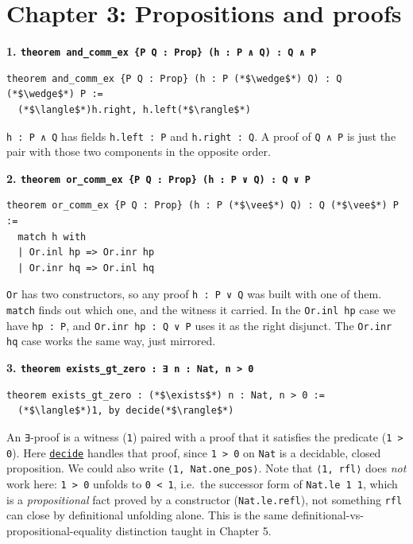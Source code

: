 \section{Chapter 3: Propositions and proofs}\label{sec:14-appendix-solutions:02-chapter-3:1}

\textbf{1. \texttt{theorem and\_\allowbreak{}comm\_\allowbreak{}ex \{P Q : Prop\} (h : P ∧ Q) : Q ∧ P}}

\begin{lstlisting}
theorem and_comm_ex {P Q : Prop} (h : P (*$\wedge$*) Q) : Q (*$\wedge$*) P :=
  (*$\langle$*)h.right, h.left(*$\rangle$*)
\end{lstlisting}

\texttt{h : P ∧ Q} has fields \texttt{h.left : P} and \texttt{h.right : Q}. A proof of \texttt{Q ∧ P} is just the pair with those two components in the opposite order.

\textbf{2. \texttt{theorem or\_\allowbreak{}comm\_\allowbreak{}ex \{P Q : Prop\} (h : P ∨ Q) : Q ∨ P}}

\begin{lstlisting}
theorem or_comm_ex {P Q : Prop} (h : P (*$\vee$*) Q) : Q (*$\vee$*) P :=
  match h with
  | Or.inl hp => Or.inr hp
  | Or.inr hq => Or.inl hq
\end{lstlisting}

\texttt{Or} has two constructors, so any proof \texttt{h : P ∨ Q} was built with one of them. \texttt{match} finds out which one, and the witness it carried. In the \texttt{Or.inl hp} case we have \texttt{hp : P}, and \texttt{Or.inr hp : Q ∨ P} uses it as the right disjunct. The \texttt{Or.inr hq} case works the same way, just mirrored.

\textbf{3. \texttt{theorem exists\_\allowbreak{}gt\_\allowbreak{}zero : ∃ n : Nat, n > 0}}

\begin{lstlisting}
theorem exists_gt_zero : (*$\exists$*) n : Nat, n > 0 :=
  (*$\langle$*)1, by decide(*$\rangle$*)
\end{lstlisting}

An \texttt{∃}-proof is a witness (\texttt{1}) paired with a proof that it satisfies the predicate (\texttt{1 > 0}). Here \href{https://lean-lang.org/doc/reference/latest/Tactic-Proofs/Tactic-Reference/}{\texttt{decide}} handles that proof, since \texttt{1 > 0} on \texttt{Nat} is a decidable, closed proposition. We could also write \texttt{⟨1, Nat.one\_\allowbreak{}pos⟩}. Note that \texttt{⟨1, rfl⟩} does \emph{not} work here: \texttt{1 > 0} unfolds to \texttt{0 < 1}, i.e.~the successor form of \texttt{Nat.le 1 1}, which is a \emph{propositional} fact proved by a constructor (\texttt{Nat.le.refl}), not something \texttt{rfl} can close by definitional unfolding alone. This is the same definitional-vs-propositional-equality distinction taught in Chapter 5.
